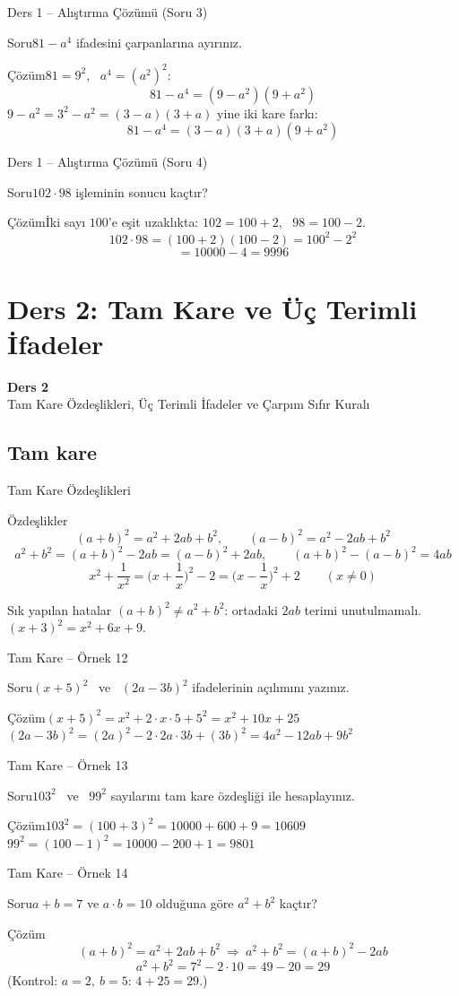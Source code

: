\documentclass[aspectratio=169,11pt,handout]{beamer}
\newcommand{\soru}[3]{%
\begin{frame}{#1}
  \begin{block}{Soru}\large #2\end{block}
  \pause
  \begin{exampleblock}{Çözüm}\large #3\end{exampleblock}
\end{frame}}
\begin{document}
\soru{Ders 1 -- Alıştırma Çözümü (Soru 3)}
{\(81-a^4\) ifadesini çarpanlarına ayırınız.}
{\(81=9^2\), \ \(a^4=(a^2)^2\):
\[81-a^4=(9-a^2)(9+a^2)\]
\(9-a^2=3^2-a^2=(3-a)(3+a)\) yine iki kare farkı:
\[81-a^4=(3-a)(3+a)(9+a^2)\]}

\soru{Ders 1 -- Alıştırma Çözümü (Soru 4)}
{\(102\cdot 98\) işleminin sonucu kaçtır?}
{İki sayı \(100\)'e eşit uzaklıkta: \(102=100+2\), \ \(98=100-2\).
\[102\cdot 98=(100+2)(100-2)=100^2-2^2\]
\[=10000-4=9996\]}


\section{Ders 2: Tam Kare ve Üç Terimli İfadeler}
\begin{frame}
\centering\Large\color{anamavi}\textbf{Ders 2}\\[6pt]\normalsize Tam Kare Özdeşlikleri, Üç Terimli İfadeler ve Çarpım Sıfır Kuralı
\end{frame}

\subsection{Tam kare}
\begin{frame}{Tam Kare Özdeşlikleri}
\begin{block}{Özdeşlikler}
\[(a+b)^2=a^2+2ab+b^2,\qquad (a-b)^2=a^2-2ab+b^2\]
\[a^2+b^2=(a+b)^2-2ab=(a-b)^2+2ab,\qquad (a+b)^2-(a-b)^2=4ab\]
\[x^2+\frac{1}{x^2}=\Big(x+\frac{1}{x}\Big)^2-2=\Big(x-\frac{1}{x}\Big)^2+2\qquad(x\neq 0)\]
\end{block}
\begin{alertblock}{Sık yapılan hatalar}
\((a+b)^2\neq a^2+b^2\): ortadaki \(2ab\) terimi unutulmamalı. \quad \((x+3)^2=x^2+6x+9\).
\end{alertblock}
\end{frame}

\soru{Tam Kare -- Örnek 12}
{\((x+5)^2\) \ ve \ \((2a-3b)^2\) ifadelerinin açılımını yazınız.}
{\((x+5)^2=x^2+2\cdot x\cdot 5+5^2=x^2+10x+25\)\\[4pt]
\((2a-3b)^2=(2a)^2-2\cdot 2a\cdot 3b+(3b)^2=4a^2-12ab+9b^2\)}

\soru{Tam Kare -- Örnek 13}
{\(103^2\) \ ve \ \(99^2\) sayılarını tam kare özdeşliği ile hesaplayınız.}
{\(103^2=(100+3)^2=10000+600+9=10609\)\\[4pt]
\(99^2=(100-1)^2=10000-200+1=9801\)}

\soru{Tam Kare -- Örnek 14}
{\(a+b=7\) ve \(a\cdot b=10\) olduğuna göre \(a^2+b^2\) kaçtır?}
{\[(a+b)^2=a^2+2ab+b^2\ \Rightarrow\ a^2+b^2=(a+b)^2-2ab\]
\[a^2+b^2=7^2-2\cdot 10=49-20=29\]
(Kontrol: \(a=2,\ b=5\): \(4+25=29\).)}
\end{document}
